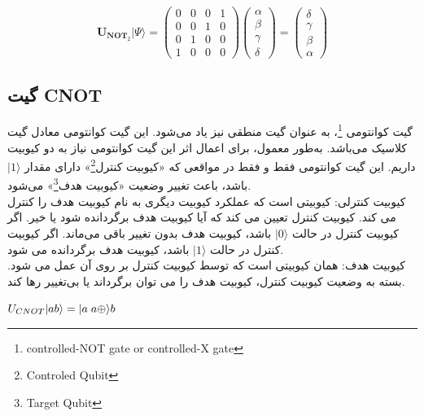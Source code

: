 \documentclass{book}
\begin{document}
\begin{center}
	$$\boldsymbol{U}_{\boldsymbol{N} \boldsymbol{O} \boldsymbol{T}_2}|\Psi\rangle=\left(\begin{array}{llll}
		0 & 0 & 0 & 1 \\
		0 & 0 & 1 & 0 \\
		0 & 1 & 0 & 0 \\
		1 & 0 & 0 & 0
	\end{array}\right)\left(\begin{array}{l}
		\alpha \\
		\beta \\
		\gamma \\
		\delta
	\end{array}\right)=\left(\begin{array}{l}
		\delta \\
		\gamma \\
		\beta \\
		\alpha
	\end{array}\right)$$
\end{center}


\subsection*{گیت CNOT}

گیت کوانتومی \footnote{ controlled-NOT gate or controlled-X gate}، به عنوان گیت منطقی نیز یاد می‌شود. این گیت کوانتومی معادل گیت  کلاسیک می‌باشد.
به‌طور معمول، برای اعمال اثر این گیت کوانتومی نیاز به دو کیوبیت داریم. این گیت کوانتومی فقط و فقط در مواقعی که «کیوبیت کنترل\footnote{Controled Qubit}» دارای مقدار $\vert 1 \rangle$ باشد، باعث تغییر وضعیت «کیوبیت هدف\footnote{Target Qubit}» می‌شود.\\

کیوبیت کنترلی: کیوبیتی است که عملکرد کیوبیت دیگری به نام کیوبیت هدف را کنترل می کند. کیوبیت کنترل تعیین می کند که آیا کیوبیت هدف برگردانده شود یا خیر. اگر کیوبیت کنترل در حالت $\vert 0 \rangle$ باشد، کیوبیت هدف بدون تغییر باقی می‌ماند. اگر کیوبیت کنترل در حالت $\vert 1 \rangle$ باشد، کیوبیت هدف برگردانده می شود.\\

کیوبیت هدف: همان کیوبیتی است که توسط کیوبیت کنترل بر روی آن عمل می شود. بسته به وضعیت کیوبیت کنترل، کیوبیت هدف را می توان برگرداند یا بی‌تغییر رها کند.\\


\begin{center}
	$U_{CNOT}\vert ab\rangle = \vert a\hspace{0.1cm} a\oplus \rangle b$
\end{center}
\end{document}
